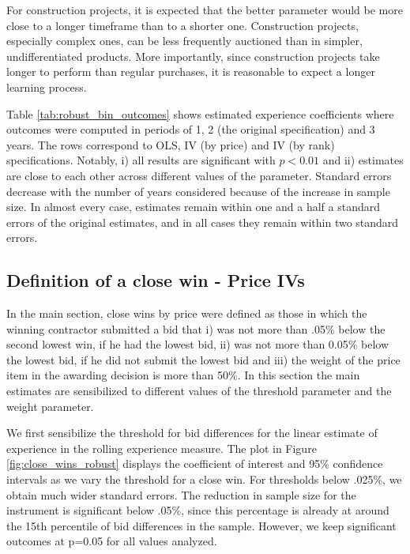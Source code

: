 For construction projects, it is expected that the better parameter would be more close to a longer timeframe than to a shorter one. Construction projects, especially complex ones, can be less frequently auctioned than in simpler, undifferentiated products. More importantly, since construction projects take longer to perform than regular purchases, it is reasonable to expect a longer learning process.

Table \ref{tab:robust_bin_outcomes} shows estimated experience coefficients where outcomes were computed in periods of 1, 2 (the original specification) and 3 years. The rows correspond to OLS, IV (by price) and IV (by rank) specifications. Notably, i) all results are significant with $p<0.01$ and ii) estimates are close to each other across different values of the parameter. Standard errors decrease with the number of years considered because of the increase in sample size. In almost every case, estimates remain within one and a half a standard errors of the original estimates, and in all cases they remain within two standard errors.


\subsection{Definition of a close win - Price IVs}
In the main section, close wins by price were defined as those in which the winning contractor submitted a bid that i) was not more than .05\% below the second lowest win, if he had the lowest bid, ii) was not more than 0.05\% below the lowest bid, if he did not submit the lowest bid and iii) the weight of the price item in the awarding decision is more than 50\%. In this section the main estimates are sensibilized to different values of the threshold parameter and the weight parameter.

We first sensibilize the threshold for bid differences for the linear estimate of experience in the rolling experience measure. The plot in Figure \ref{fig:close_wins_robust} displays the coefficient of interest and 95\% confidence intervals as we vary the threshold for a close win.  For thresholds below .025\%, we obtain much wider standard errors. The reduction in sample size for the instrument is significant below .05\%, since this percentage is already at around the 15th percentile of bid differences in the sample. However, we keep significant outcomes at p=0.05 for all values analyzed.

